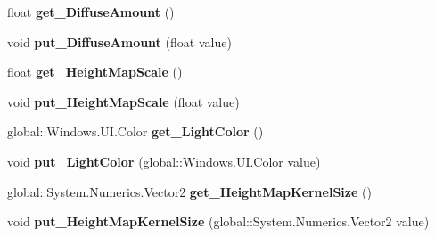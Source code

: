 \begin{DoxyCompactItemize}
float {\bfseries get\+\_\+\+Diffuse\+Amount} ()
\item 
\mbox{\label{class_microsoft_1_1_graphics_1_1_canvas_1_1_effects_1_1_point_diffuse_effect_affb2f6cbd197bd128a5db97cc5456962}} 
void {\bfseries put\+\_\+\+Diffuse\+Amount} (float value)
\item 
\mbox{\label{class_microsoft_1_1_graphics_1_1_canvas_1_1_effects_1_1_point_diffuse_effect_a8c5829829e52c84efac9568f69940ea3}} 
float {\bfseries get\+\_\+\+Height\+Map\+Scale} ()
\item 
\mbox{\label{class_microsoft_1_1_graphics_1_1_canvas_1_1_effects_1_1_point_diffuse_effect_a0e6bfd9493f7d60a5d2fe5db8de1f4a5}} 
void {\bfseries put\+\_\+\+Height\+Map\+Scale} (float value)
\item 
\mbox{\label{class_microsoft_1_1_graphics_1_1_canvas_1_1_effects_1_1_point_diffuse_effect_a45b883cb61e3ca8e50ee0a361ad67d2a}} 
global\+::\+Windows.\+U\+I.\+Color {\bfseries get\+\_\+\+Light\+Color} ()
\item 
\mbox{\label{class_microsoft_1_1_graphics_1_1_canvas_1_1_effects_1_1_point_diffuse_effect_a13a7900563eab531b15cf8cac419ee7a}} 
void {\bfseries put\+\_\+\+Light\+Color} (global\+::\+Windows.\+U\+I.\+Color value)
\item 
\mbox{\label{class_microsoft_1_1_graphics_1_1_canvas_1_1_effects_1_1_point_diffuse_effect_aa46ecfd6edc8b589792c66c7da0e3293}} 
global\+::\+System.\+Numerics.\+Vector2 {\bfseries get\+\_\+\+Height\+Map\+Kernel\+Size} ()
\item 
\mbox{\label{class_microsoft_1_1_graphics_1_1_canvas_1_1_effects_1_1_point_diffuse_effect_a5700c74ed301f5b7177afb7776326518}} 
void {\bfseries put\+\_\+\+Height\+Map\+Kernel\+Size} (global\+::\+System.\+Numerics.\+Vector2 value)

\end{DoxyCompactItemize}
